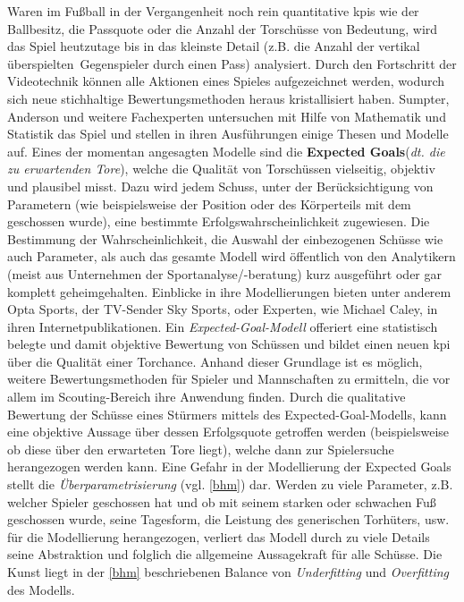 Waren im Fußball in der Vergangenheit noch rein quantitative \glspl{kpi} wie der Ballbesitz, die Passquote oder die Anzahl der Torschüsse von Bedeutung, wird das Spiel heutzutage bis in das kleinste Detail (z.B. die Anzahl der vertikal \glqq überspielten\grqq~Gegenspieler durch einen Pass) analysiert. Durch den Fortschritt der Videotechnik können alle Aktionen eines Spieles aufgezeichnet werden, wodurch sich neue stichhaltige Bewertungsmethoden heraus kristallisiert haben. Sumpter, Anderson und weitere Fachexperten untersuchen mit Hilfe von Mathematik und Statistik das Spiel und stellen in ihren Ausführungen einige Thesen und Modelle auf. Eines der momentan angesagten Modelle sind die \glqq \textbf{Expected Goals}\grqq (\textit{dt. die zu erwartenden Tore}), welche die Qualität von Torschüssen vielseitig, objektiv und plausibel misst. Dazu wird jedem Schuss, unter der Berücksichtigung von Parametern (wie beispielsweise der Position oder des Körperteils mit dem geschossen wurde), eine bestimmte Erfolgswahrscheinlichkeit zugewiesen. Die Bestimmung der Wahrscheinlichkeit, die Auswahl der einbezogenen Schüsse wie auch Parameter, als auch das gesamte Modell wird öffentlich von den Analytikern (meist aus Unternehmen der Sportanalyse/-beratung) kurz ausgeführt oder gar komplett geheimgehalten. Einblicke in ihre Modellierungen bieten unter anderem Opta Sports, der TV-Sender Sky Sports, oder Experten, wie Michael Caley, in ihren Internetpublikationen. Ein \textit{Expected-Goal-Modell} offeriert eine statistisch belegte und damit objektive Bewertung von Schüssen und bildet einen neuen \gls{kpi} über die Qualität einer Torchance. Anhand dieser Grundlage ist es möglich, weitere Bewertungsmethoden für Spieler und Mannschaften zu ermitteln, die vor allem im Scouting-Bereich ihre Anwendung finden. Durch die qualitative Bewertung der Schüsse eines Stürmers mittels des Expected-Goal-Modells, kann eine objektive Aussage über dessen Erfolgsquote getroffen werden (beispielsweise ob diese über den erwarteten Tore liegt), welche dann zur Spielersuche herangezogen werden kann. Eine Gefahr in der Modellierung der Expected Goals stellt die \textit{Überparametrisierung} (vgl. \vref{bhm}) dar. Werden zu viele Parameter, z.B. welcher Spieler geschossen hat und ob mit seinem starken oder schwachen Fuß geschossen wurde, seine Tagesform, die Leistung des generischen Torhüters, usw. für die Modellierung herangezogen, verliert das Modell durch zu viele Details seine Abstraktion und folglich die allgemeine Aussagekraft für alle Schüsse. Die Kunst liegt in der \vref{bhm} beschriebenen Balance von \textit{Underfitting} und \textit{Overfitting} des Modells.

